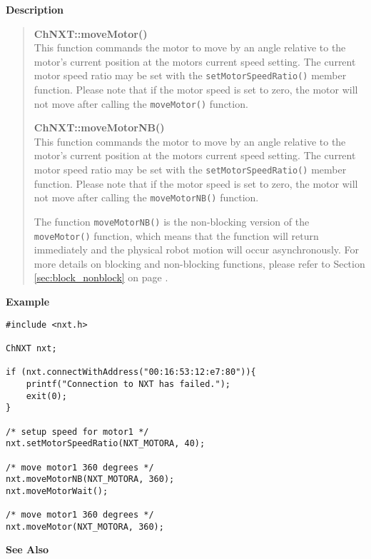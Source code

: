 \noindent
{\bf Description}\\
\vspace{-12pt}
\begin{quote}
{\bf ChNXT::moveMotor()}\\
This function commands the motor to move by an angle relative to 
the motor's current position at the motors current speed setting.
The current motor speed ratio may be set with the 
\texttt{setMotorSpeedRatio()} member function. Please note that if
the motor speed is set to zero, the motor will not move after 
calling the \texttt{moveMotor()} function. 

{\bf ChNXT::moveMotorNB()}\\
This function commands the motor to move by an angle relative to 
the motor's current position at the motors current speed setting.
The current motor speed ratio may be set with the
\texttt{setMotorSpeedRatio()} member function. Please note that if
the motor speed is set to zero, the motor will not move after 
calling the \texttt{moveMotorNB()} function. 

The function \texttt{moveMotorNB()} is the non-blocking version of
the \texttt{moveMotor()} function, which means that the function 
will return immediately and the physical robot motion will occur 
asynchronously. For more details on blocking and non-blocking 
functions, please refer to Section \ref{sec:block_nonblock} on page 
\pageref{sec:block_nonblock}.\\
\end{quote}

\noindent
{\bf Example}
\begin{lstlisting}
#include <nxt.h> 

ChNXT nxt;

if (nxt.connectWithAddress("00:16:53:12:e7:80")){
    printf("Connection to NXT has failed.");
    exit(0);
}
 
/* setup speed for motor1 */
nxt.setMotorSpeedRatio(NXT_MOTORA, 40);

/* move motor1 360 degrees */
nxt.moveMotorNB(NXT_MOTORA, 360);
nxt.moveMotorWait();

/* move motor1 360 degrees */
nxt.moveMotor(NXT_MOTORA, 360);
\end{lstlisting}

\noindent
{\bf See Also}\\
